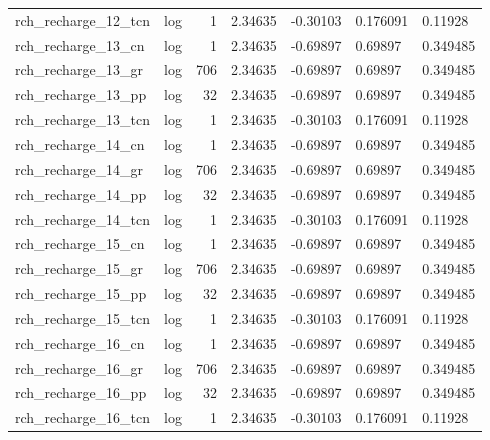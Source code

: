 \documentclass{article}
\begin{document}
\begin{center}
\begin{landscape}
\begin{longtable}{llrllll}
rch\_recharge\_12\_tcn &       log &      1 &        2.34635 &       -0.30103 &       0.176091 &            0.11928 \\
 rch\_recharge\_13\_cn &       log &      1 &        2.34635 &       -0.69897 &        0.69897 &           0.349485 \\
 rch\_recharge\_13\_gr &       log &    706 &        2.34635 &       -0.69897 &        0.69897 &           0.349485 \\
 rch\_recharge\_13\_pp &       log &     32 &        2.34635 &       -0.69897 &        0.69897 &           0.349485 \\
rch\_recharge\_13\_tcn &       log &      1 &        2.34635 &       -0.30103 &       0.176091 &            0.11928 \\
 rch\_recharge\_14\_cn &       log &      1 &        2.34635 &       -0.69897 &        0.69897 &           0.349485 \\
 rch\_recharge\_14\_gr &       log &    706 &        2.34635 &       -0.69897 &        0.69897 &           0.349485 \\
 rch\_recharge\_14\_pp &       log &     32 &        2.34635 &       -0.69897 &        0.69897 &           0.349485 \\
rch\_recharge\_14\_tcn &       log &      1 &        2.34635 &       -0.30103 &       0.176091 &            0.11928 \\
 rch\_recharge\_15\_cn &       log &      1 &        2.34635 &       -0.69897 &        0.69897 &           0.349485 \\
 rch\_recharge\_15\_gr &       log &    706 &        2.34635 &       -0.69897 &        0.69897 &           0.349485 \\
 rch\_recharge\_15\_pp &       log &     32 &        2.34635 &       -0.69897 &        0.69897 &           0.349485 \\
rch\_recharge\_15\_tcn &       log &      1 &        2.34635 &       -0.30103 &       0.176091 &            0.11928 \\
 rch\_recharge\_16\_cn &       log &      1 &        2.34635 &       -0.69897 &        0.69897 &           0.349485 \\
 rch\_recharge\_16\_gr &       log &    706 &        2.34635 &       -0.69897 &        0.69897 &           0.349485 \\
 rch\_recharge\_16\_pp &       log &     32 &        2.34635 &       -0.69897 &        0.69897 &           0.349485 \\
rch\_recharge\_16\_tcn &       log &      1 &        2.34635 &       -0.30103 &       0.176091 &            0.11928 \\

\end{longtable}
\end{landscape}
\end{center}
\end{document}
